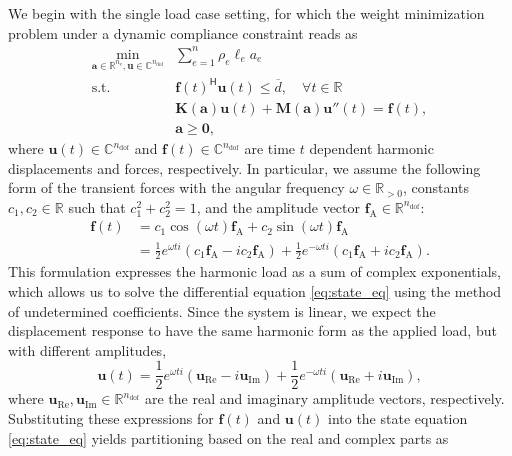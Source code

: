 \documentclass[preprint,3p]{elsarticle}
\newcommand{\TC}{^{\mathsf H}}
\newcommand{\nel}{n_\mathrm{e}}
\newcommand{\ndof}{n_\mathrm{dof}}
\newcommand{\A}{\mathrm{A}}
\newcommand{\Real}{\mathrm{Re}}
\newcommand{\I}{\mathrm{Im}}
\numberwithin{equation}{section}
\begin{document}
We begin with the single load case setting, for which the weight minimization problem under a dynamic compliance constraint reads as
%
\begin{subequations}\label{eq:dynamiccomplianceopt}
  \begin{align}
    \min_{\mathbf{a}\in \mathbb{R}^{\nel}, \mathbf{u} \in \mathbb{C}^{\ndof}} & \sum_{e=1}^{n} \rho_e \ell_e a_e\\
    \mathrm{s.t.}\; & \mathbf{f}(t)\TC \mathbf{u}(t) \le \overline{d}, \quad\forall t\in \mathbb{R}\label{eq:dynamiccompliance_abs}\\
    & \mathbf{K}(\mathbf{a})\mathbf{u}(t) + \mathbf{M}(\mathbf{a})\mathbf{u}''(t) = \mathbf{f}(t),\label{eq:state_eq}\\
    & \mathbf{a}\ge \mathbf{0},
  \end{align}
\end{subequations}
%
where $\mathbf{u}(t) \in \mathbb{C}^{\ndof}$ and $\mathbf{f}(t) \in \mathbb{C}^{\ndof}$ are time $t$ dependent harmonic displacements and forces, respectively. In particular, we assume the following form of the transient forces with the angular frequency $\omega \in \mathbb{R}_{>0}$, constants $c_1, c_2 \in \mathbb{R}$ such that $c_1^2+c_2^2=1$, and the amplitude vector $\mathbf{f}_\A \in \mathbb{R}^{\ndof}$:
%
\begin{equation}\label{eq:forces}
  \begin{aligned}
    \mathbf{f}(t) &= c_1 \cos(\omega t) \mathbf{f}_\A + c_2 \sin(\omega t) \mathbf{f}_\A\\
    &= \frac{1}{2} e^{\omega t i}(c_1 \mathbf{f}_\A - i c_2 \mathbf{f}_\A) + \frac{1}{2} e^{-\omega t i}( c_1 \mathbf{f}_\A + i c_2 \mathbf{f}_\A).
  \end{aligned}
\end{equation}
%
This formulation expresses the harmonic load as a sum of complex exponentials, which allows us to solve the differential equation \eqref{eq:state_eq} using the method of undetermined coefficients. Since the system is linear, we expect the displacement response to have the same harmonic form as the applied load, but with different amplitudes,
%
\begin{equation}
  \mathbf{u}(t) = \frac{1}{2} e^{\omega t i}(\mathbf{u}_\Real - i \mathbf{u}_\I) + \frac{1}{2} e^{-\omega t i}( \mathbf{u}_\Real + i \mathbf{u}_\I),
\end{equation}
%
where $\mathbf{u}_\Real, \mathbf{u}_\I \in \mathbb{R}^{\ndof}$ are the real and imaginary amplitude vectors, respectively. Substituting these expressions for $\mathbf{f}(t)$ and $\mathbf{u}(t)$ into the state equation \eqref{eq:state_eq} yields partitioning based on the real and complex parts as
\end{document}

